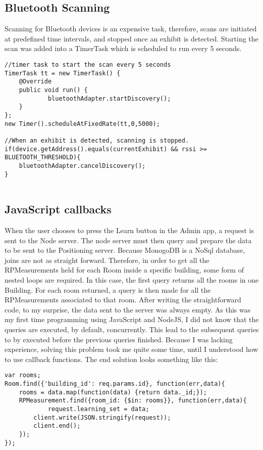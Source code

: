 \subsection{Bluetooth Scanning}
Scanning for Bluetooth devices is an expensive task, therefore, scans are initiated at predefined time intervals, and stopped once an exhibit is detected. Starting the scan was added into a TimerTask which is scheduled to run every 5 seconds.
\begin{lstlisting}
//timer task to start the scan every 5 seconds
TimerTask tt = new TimerTask() {
	@Override
    public void run() {
    		bluetoothAdapter.startDiscovery();
    }
};
new Timer().scheduleAtFixedRate(tt,0,5000);
        
//When an exhibit is detected, scanning is stopped.
if(device.getAddress().equals(currentExhibit) && rssi >= BLUETOOTH_THRESHOLD){
	bluetoothAdapter.cancelDiscovery();
}                      
        
\end{lstlisting}

\subsection{JavaScript callbacks} 
When the user chooses to press the Learn button in the Admin app, a request is sent to the Node server. The node server must then query and prepare the data to be sent to the Positioning server. Because MonogoDB is a NoSql database, joins are not as straight forward. Therefore, in order to get all the RPMeasurements held for each Room inside a specific building, some form of nested loops are required. In this case, the first query returns all the rooms in one Building. For each room returned, a query is then made for all the RPMeasurements associated to that room. After writing the straightforward code, to my surprise, the data sent to the server was always empty. As this was my first time programming using JavaScript and NodeJS, I did not know that the queries are executed, by default, concurrently. This lead to the subsequent queries to by executed before the previous queries finished. Because I was lacking experience, solving this problem took me quite some time, until I understood how to use callback functions. The end solution looks something like this:
\begin{lstlisting}
var rooms;
Room.find({'building_id': req.params.id}, function(err,data){
	rooms = data.map(function(data) {return data._id;});
    RPMeasurement.find({room_id: {$in: rooms}}, function(err,data){
    		request.learning_set = data;
        client.write(JSON.stringify(request));
        client.end();
    });
});
\end{lstlisting}